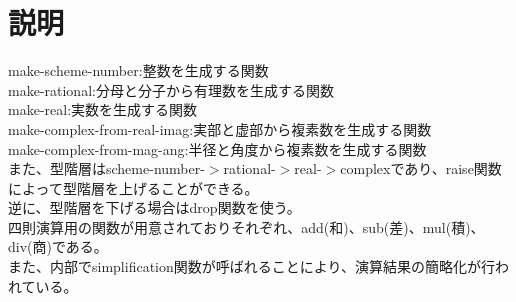 ﻿\documentclass[a4paper,12pt]{article}
\begin{document}
\section{説明}
make-scheme-number:整数を生成する関数\\
make-rational:分母と分子から有理数を生成する関数\\
make-real:実数を生成する関数\\
make-complex-from-real-imag:実部と虚部から複素数を生成する関数\\
make-complex-from-mag-ang:半径と角度から複素数を生成する関数\\
また、型階層はscheme-number-$>$rational-$>$real-$>$complexであり、raise関数によって型階層を上げることができる。\\
逆に、型階層を下げる場合はdrop関数を使う。\\
四則演算用の関数が用意されておりそれぞれ、add(和)、sub(差)、mul(積)、div(商)である。\\
また、内部でsimplification関数が呼ばれることにより、演算結果の簡略化が行われている。\\
\end{document}
